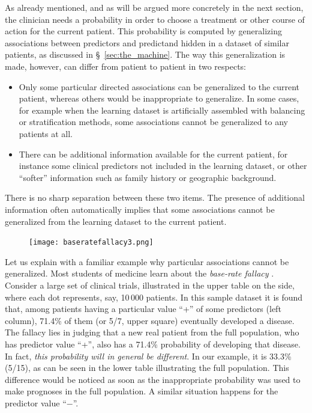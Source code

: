 \documentclass[utf8]{FrontiersinHarvard} %
\newcommand*{\sect}{\S}%
\renewcommand*{\|}[1][]{\nonscript\:#1\vert\nonscript\:\mathopen{}}
\begin{document}
As already mentioned, and as will be argued more concretely in the next section, the clinician needs a probability in order to choose a treatment or other course of action for the current patient. This probability is computed by generalizing associations between predictors and predictand hidden in a dataset of similar patients, as discussed in \sect~\ref{sec:the_machine}. The way this generalization is made, however, can differ from patient to patient in two respects:
\begin{itemize}
\item Only some particular directed associations can be generalized to the current patient, whereas others would be inappropriate to generalize. In some cases, for example when the learning dataset is artificially assembled with balancing or stratification methods, some associations cannot be generalized to any patients at all.
\item There can be additional information available for the current patient, for instance some clinical predictors not included in the learning dataset, or other \enquote{softer} information such as family history or geographic background.
\end{itemize}
There is no sharp separation between these two items. The presence of additional information often automatically implies that some associations cannot be generalized from the learning dataset to the current patient.


\setlength{\intextsep}{0ex}%
\setlength{\columnsep}{1ex}%
\begin{figure}%
\texttt{[image: baseratefallacy3.png]}%
\end{figure}%
Let us explain with a familiar example why particular associations cannot be generalized. Most students of medicine
learn about the \emph{base-rate fallacy} \citep{barhillel1980,jennyetal2018,sprengeretal2021,matthews1996}. Consider a large set of clinical trials, illustrated in the upper table on the side, where each dot represents, say, 10\,000 patients. In this sample dataset it is found that, among patients having a particular value \enquote{+} of some predictors (left column), 71.4\% of them (or 5/7, upper square) eventually developed a disease. The fallacy lies in judging that a new real patient from the full population, who has predictor value \enquote{+}, also has a 71.4\% probability of developing that disease. In fact, \emph{this probability will in general be different}. In our example, it is 33.3\% (5/15), as can be seen in the lower table illustrating the full population. This difference would be noticed as soon as the inappropriate probability was used to make prognoses in the full population. A similar situation happens for the predictor value \enquote{$-$}.
\end{document}
